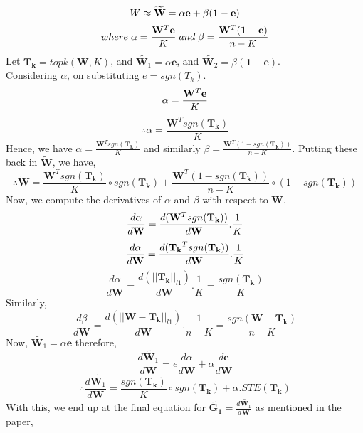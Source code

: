 $$W \approx \widetilde{\mathbf{W}} = \alpha \mathbf{e} + \beta \mathbf{(1-e)} \\$$
$$where\; \alpha =\frac{\mathbf{W}^{T}\mathbf{e}}{K} \; and \; \beta = \frac{\mathbf{W}^{T}\mathbf{(1-e)}}{n-K} \\$$
Let $\mathbf{T_k} = topk(\mathbf{W}, K)$, and $\widetilde{\mathbf{W}_{1}} = \alpha \mathbf{e}$, and $\widetilde{\mathbf{W}_{2}} = \beta \mathbf{(1-e)}$. \\
Considering $\alpha$, on substituting $e = sgn(T_k)$. \\
$$\alpha = \frac{\mathbf{W}^{T}\mathbf{e}}{K} \\$$
$$\therefore \alpha = \frac{\mathbf{W}^{T}sgn(\mathbf{T_k})}{K}$$
Hence, we have $\alpha = \frac{\mathbf{W}^{T}sgn(\mathbf{T_k})}{K}$ and similarly $\beta = \frac{\mathbf{W}^{T}(1-sgn(\mathbf{T_k}))}{n-K}$. Putting these back in $\widetilde{\mathbf{W}}$, we have, \\
\begin{dmath}
\therefore \widetilde{\mathbf{W}} = \frac{\mathbf{W}^{T}sgn(\mathbf{T_k})}{K}\circ sgn\mathbf{(T_k)} + \frac{\mathbf{W}^{T}(1-sgn(\mathbf{T_k}))}{n-K}\circ (1-sgn\mathbf{(T_k)})
\end{dmath}
Now, we compute the derivatives of $\alpha$ and $\beta$ with respect to $\mathbf{W}$,
$$\frac{d\alpha }{d\mathbf{W}} = \frac{d(\mathbf{W}^{T}sgn(\mathbf{T_k}))}{d\mathbf{W}}.\frac{1}{K} \\$$
$$\frac{d\alpha }{d\mathbf{W}} = \frac{d(\mathbf{T_k}^{T}sgn(\mathbf{T_k}))}{d\mathbf{W}}.\frac{1}{K} \\$$
\begin{dmath}
\frac{d\alpha }{d\mathbf{W}} = \frac{d(||\mathbf{T_k}||_{l1})}{d\mathbf{W}}.\frac{1}{K}=\frac{sgn(\mathbf{T_k})}{K}
\end{dmath}
Similarly, \\
\begin{dmath}
\frac{d\beta}{d\mathbf{W}} = \frac{d(||\mathbf{W}-\mathbf{T_k}||_{l1})}{d\mathbf{W}}.\frac{1}{n-K}=\frac{sgn(\mathbf{W}-\mathbf{T_k})}{n-K}
\end{dmath}
Now, $\widetilde{\mathbf{W}_{1}} = \alpha \mathbf{e}$ therefore,
$$\frac{d\widetilde{\mathbf{W}_{1}}}{d\mathbf{W}} = e \frac{d\alpha}{d\mathbf{W}} + \alpha \frac{d\mathbf{e}}{d\mathbf{W}} $$
$$\therefore \frac{d\widetilde{\mathbf{W}_{1}}}{d\mathbf{W}} = \frac{sgn(\mathbf{T_k})}{K}\circ sgn(\mathbf{T_k}) + \alpha.STE(\mathbf{T_k})$$
With this, we end up at the final equation for $\widetilde{\mathbf{G_1}} = \frac{d\widetilde{\mathbf{W}_{1}}}{d\mathbf{W}}$ as mentioned in the paper,
